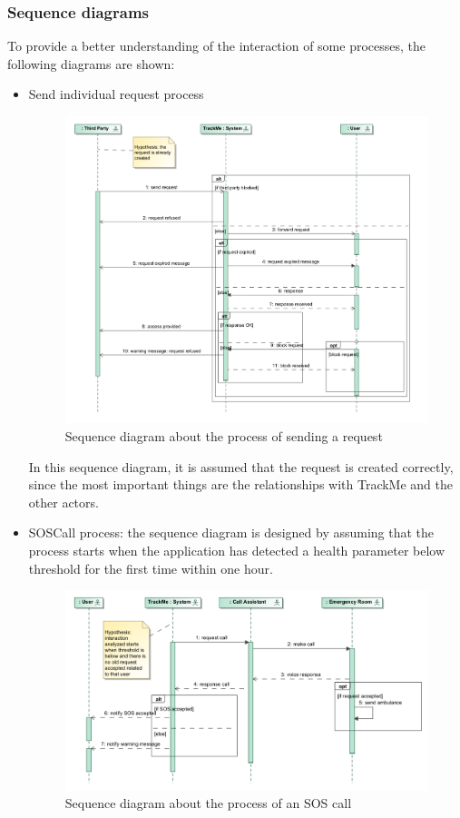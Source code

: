 \subsubsection{Sequence diagrams}
To provide a better understanding of the interaction of some processes, the following diagrams are shown:
\begin{itemize}
\item Send individual request process
\begin{figure}[H]
\includegraphics[width=\linewidth]{Images/requestsequence}
\caption{Sequence diagram about the process of sending a request }
\label{fig:sequencediagram1}
\end{figure}
In this sequence diagram, it is assumed that the request is created correctly, since the most important things are the relationships with TrackMe and the other actors.

\item SOSCall process: the sequence diagram is designed by assuming that the process starts when the application has detected a health parameter below threshold for the first time within one hour.
\begin{figure}[H]
\includegraphics[width=\linewidth]{Images/callsequence}
\caption{Sequence diagram about the process of an SOS call }
\label{fig:sequencediagram2}
\end{figure}


\end{itemize}
